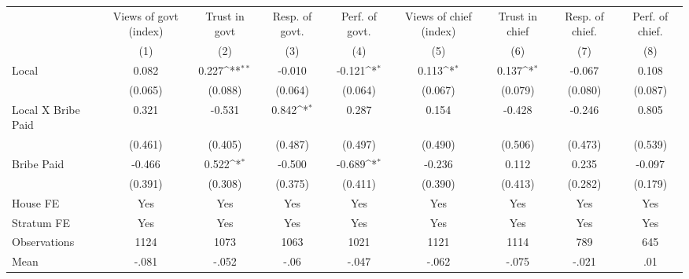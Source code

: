 {
\def\sym#1{\ifmmode^{#1}\else\(^{#1}\)\fi}
\begin{tabular}{l*{8}{c}}
\hline\hline
                &\multicolumn{1}{c}{Views of govt (index)}&\multicolumn{1}{c}{Trust in govt}&\multicolumn{1}{c}{Resp. of govt.}&\multicolumn{1}{c}{Perf. of govt.}&\multicolumn{1}{c}{Views of chief (index)}&\multicolumn{1}{c}{Trust in chief}&\multicolumn{1}{c}{Resp. of chief.}&\multicolumn{1}{c}{Perf. of chief.}\\
                &\multicolumn{1}{c}{(1)}         &\multicolumn{1}{c}{(2)}         &\multicolumn{1}{c}{(3)}         &\multicolumn{1}{c}{(4)}         &\multicolumn{1}{c}{(5)}         &\multicolumn{1}{c}{(6)}         &\multicolumn{1}{c}{(7)}         &\multicolumn{1}{c}{(8)}         \\
\hline
Local           &    0.082         &    0.227\sym{**} &   -0.010         &   -0.121\sym{*}  &    0.113\sym{*}  &    0.137\sym{*}  &   -0.067         &    0.108         \\
                &  (0.065)         &  (0.088)         &  (0.064)         &  (0.064)         &  (0.067)         &  (0.079)         &  (0.080)         &  (0.087)         \\
Local X Bribe Paid&    0.321         &   -0.531         &    0.842\sym{*}  &    0.287         &    0.154         &   -0.428         &   -0.246         &    0.805         \\
                &  (0.461)         &  (0.405)         &  (0.487)         &  (0.497)         &  (0.490)         &  (0.506)         &  (0.473)         &  (0.539)         \\
Bribe Paid      &   -0.466         &    0.522\sym{*}  &   -0.500         &   -0.689\sym{*}  &   -0.236         &    0.112         &    0.235         &   -0.097         \\
                &  (0.391)         &  (0.308)         &  (0.375)         &  (0.411)         &  (0.390)         &  (0.413)         &  (0.282)         &  (0.179)         \\
House FE        &      Yes         &      Yes         &      Yes         &      Yes         &      Yes         &      Yes         &      Yes         &      Yes         \\
Stratum FE      &      Yes         &      Yes         &      Yes         &      Yes         &      Yes         &      Yes         &      Yes         &      Yes         \\
\hline
Observations    &     1124         &     1073         &     1063         &     1021         &     1121         &     1114         &      789         &      645         \\
Mean            &    -.081         &    -.052         &     -.06         &    -.047         &    -.062         &    -.075         &    -.021         &      .01         \\
\hline\hline
\end{tabular}
}

